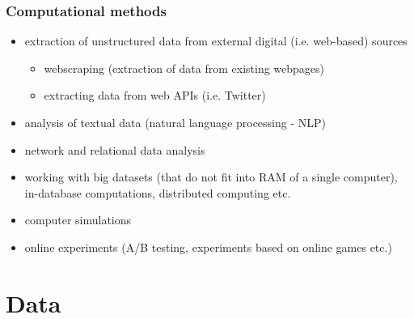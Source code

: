 \begin{frame}
    \frametitle{Computational methods}
    \begin{itemize}
        \item<1> extraction of unstructured data from external digital (i.e. web-based) sources
        \begin{itemize}
            \item<1> webscraping (extraction of data from existing webpages)
            \item<1> extracting data from web APIs (i.e. Twitter)
        \end{itemize}
        \item<1> analysis of textual data (natural language processing - NLP)
        \item<0> network and relational data analysis
        \item<0> working with big datasets (that do not fit into RAM of a single computer), in-database computations, distributed computing etc.
        \item<0> computer simulations
        \item<0> online experiments (A/B testing, experiments based on online games etc.)
    \end{itemize}
\end{frame}

\section[Data]{Data}

